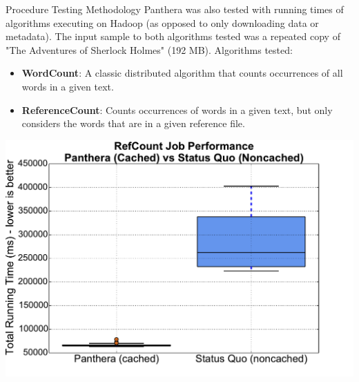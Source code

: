 \documentclass[final]{beamer} %
\begin{document}
\begin{frame}
\begin{columns}[t]
\begin{column}{0.32\textwidth}
	\begin{block}{Procedure Testing Methodology}
	Panthera was also tested with running times of algorithms executing on Hadoop (as opposed to only downloading data or metadata). The input sample to both algorithms tested was a repeated copy of "The 
	Adventures of Sherlock Holmes" (192 MB). Algorithms tested: 
	\begin{itemize}
	\item \textbf{WordCount}: A classic distributed algorithm that counts occurrences of all words in a given text.
	\item \textbf{ReferenceCount}: Counts occurrences of words in a given text, but 
	only considers the words that are in a given reference file.
	\end{itemize}
		\vspace{1.5em}
		\centerline{\includegraphics[scale=1]{assets/v2/refgetter_boxplot.pdf}}
		\end{block}



\end{column}
\end{columns}
\end{frame}
\end{document}
